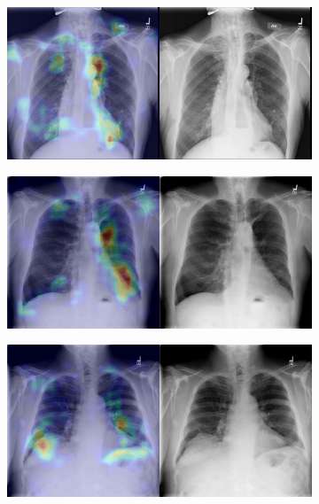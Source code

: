 \begin{figure}[b]
\begin{subfigure}{0.4\textwidth}
    \end{subfigure}
    \begin{subfigure}{0.4\textwidth}
        \centering
        \includegraphics[width=1.0\textwidth]{Chapters/5. Conclusiones/img/Hernia/1_1_00006713_017.png}
    \end{subfigure}
    \begin{subfigure}{0.4\textwidth}
        \centering
        \includegraphics[width=1.0\textwidth]{Chapters/5. Conclusiones/img/Hernia/1_1_00007894_005.png}
    \end{subfigure}
    \begin{subfigure}{0.4\textwidth}
        \centering
        \includegraphics[width=1.0\textwidth]{Chapters/5. Conclusiones/img/Hernia/1_1_00008508_003.png}

\end{subfigure}
\end{figure}
